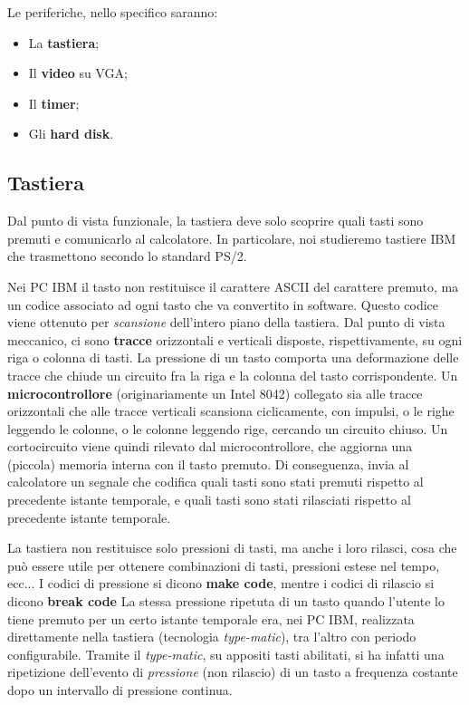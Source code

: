 \documentclass[a4paper,11pt]{article}
\begin{document}
Le periferiche, nello specifico saranno:
\begin{itemize}
	\item La \textbf{tastiera};
	\item Il \textbf{video} su VGA;
	\item Il \textbf{timer};
	\item Gli \textbf{hard disk}.
\end{itemize}

\subsection{Tastiera}
Dal punto di vista funzionale, la tastiera deve solo scoprire quali tasti sono premuti e comunicarlo al calcolatore.
In particolare, noi studieremo tastiere IBM che trasmettono secondo lo standard PS/2.

Nei PC IBM il tasto non restituisce il carattere ASCII del carattere premuto, ma un codice associato ad ogni tasto che va convertito in software.
Questo codice viene ottenuto per \textit{scansione} dell'intero piano della tastiera.
Dal punto di vista meccanico, ci sono \textbf{tracce} orizzontali e verticali disposte, rispettivamente, su ogni riga o colonna di tasti.
La pressione di un tasto comporta una deformazione delle tracce che chiude un circuito fra la riga e la colonna del tasto corrispondente.
Un \textbf{microcontrollore} (originariamente un Intel 8042) collegato sia alle tracce orizzontali che alle tracce verticali scansiona ciclicamente, con impulsi, o le righe leggendo le colonne, o le colonne leggendo rige, cercando un circuito chiuso.
Un cortocircuito viene quindi rilevato dal microcontrollore, che aggiorna una (piccola) memoria interna con il tasto premuto.
Di conseguenza, invia al calcolatore un segnale che codifica quali tasti sono stati premuti rispetto al precedente istante temporale, e quali tasti sono stati rilasciati rispetto al precedente istante temporale. 

La tastiera non restituisce solo pressioni di tasti, ma anche i loro rilasci, cosa che può essere utile per ottenere combinazioni di tasti, pressioni estese nel tempo, ecc...
I codici di pressione si dicono \textbf{make code}, mentre i codici di rilascio si dicono \textbf{break code} 
La stessa pressione ripetuta di un tasto quando l'utente lo tiene premuto per un certo istante temporale era, nei PC IBM, realizzata direttamente nella tastiera (tecnologia \textit{type-matic}), tra l'altro con periodo configurabile.
Tramite il \textit{type-matic}, su appositi tasti abilitati, si ha infatti una ripetizione dell'evento di \textit{pressione} (non rilascio) di un tasto a frequenza costante dopo un intervallo di pressione continua.
\end{document}
